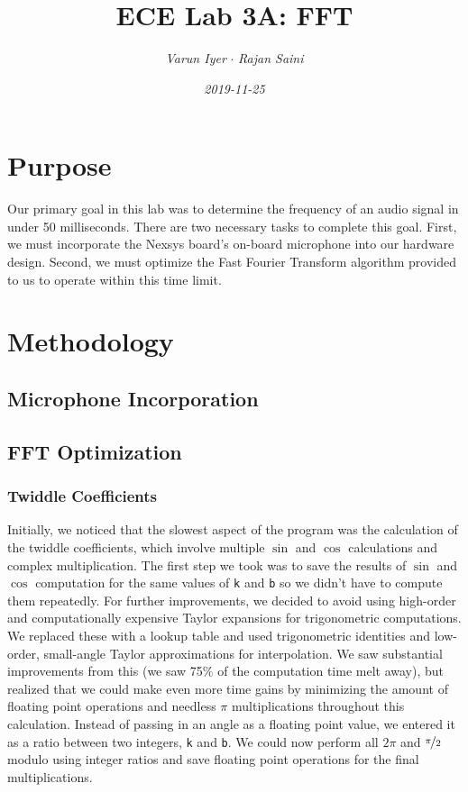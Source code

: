 \documentclass{article}
\title{\textbf{ECE Lab 3A: FFT}}
\date{\textit{2019-11-25}}
\author{\textit{Varun Iyer} \hspace{2em}$\cdot$ \hspace{2em} \textit{Rajan Saini}}
\begin{document}
\maketitle
\section{Purpose}
	Our primary goal in this lab was to determine the frequency of an audio signal in under 50 milliseconds.
	There are two necessary tasks to complete this goal.
	First, we must incorporate the Nexsys board’s on-board microphone into our hardware design.
	Second, we must optimize the Fast Fourier Transform algorithm provided to us to operate within this time limit.
\section{Methodology}
	\subsection{Microphone Incorporation}	
		
	\subsection{FFT Optimization}
		\subsubsection{Twiddle Coefficients}
			Initially, we noticed that the slowest aspect of the program was the calculation of the twiddle coefficients, which involve multiple $\sin$ and $\cos$ calculations and complex multiplication.
			The first step we took was to save the results of $\sin$ and $\cos$ computation for the same values of \texttt{k} and \texttt{b} so we didn’t have to compute them repeatedly.
			For further improvements, we decided to avoid using high-order and computationally expensive Taylor expansions for trigonometric computations.
			We replaced these with a lookup table and used trigonometric identities and low-order, small-angle Taylor approximations for interpolation.
			We saw substantial improvements from this (we saw 75\% of the computation time melt away), but realized that we could make even more time gains by minimizing the amount of floating point operations and needless $\pi$ multiplications throughout this calculation.
			Instead of passing in an angle as a floating point value, we entered it as a ratio between two integers, \texttt{k} and \texttt{b}.
			We could now perform all $2\pi$ and $\nicefrac{\pi}{2}$ modulo using integer ratios and save floating point operations for the final multiplications.
\end{document}
